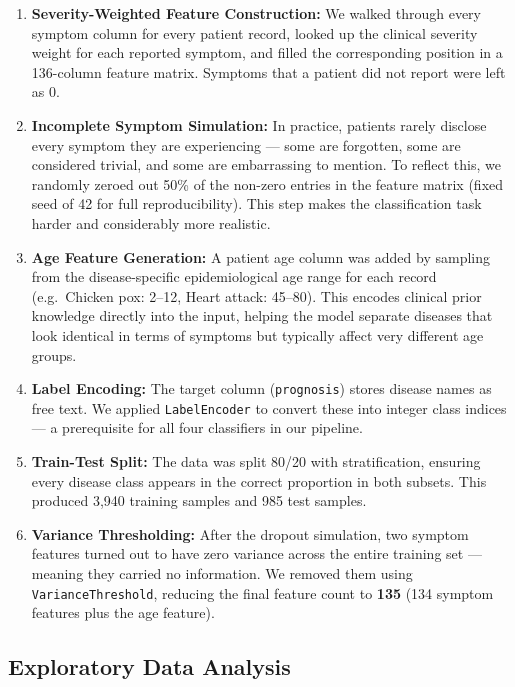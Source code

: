 \documentclass[12pt,a4paper]{article}
\begin{document}
\begin{enumerate}
    \item \textbf{Severity-Weighted Feature Construction:} We walked through every symptom column for every patient record, looked up the clinical severity weight for each reported symptom, and filled the corresponding position in a 136-column feature matrix. Symptoms that a patient did not report were left as 0.

    \item \textbf{Incomplete Symptom Simulation:} In practice, patients rarely disclose every symptom they are experiencing --- some are forgotten, some are considered trivial, and some are embarrassing to mention. To reflect this, we randomly zeroed out 50\% of the non-zero entries in the feature matrix (fixed seed of 42 for full reproducibility). This step makes the classification task harder and considerably more realistic.

    \item \textbf{Age Feature Generation:} A patient age column was added by sampling from the disease-specific epidemiological age range for each record (e.g.\ Chicken pox: 2--12, Heart attack: 45--80). This encodes clinical prior knowledge directly into the input, helping the model separate diseases that look identical in terms of symptoms but typically affect very different age groups.

    \item \textbf{Label Encoding:} The target column (\texttt{prognosis}) stores disease names as free text. We applied \texttt{LabelEncoder} to convert these into integer class indices --- a prerequisite for all four classifiers in our pipeline.

    \item \textbf{Train-Test Split:} The data was split 80/20 with stratification, ensuring every disease class appears in the correct proportion in both subsets. This produced 3,940 training samples and 985 test samples.

    \item \textbf{Variance Thresholding:} After the dropout simulation, two symptom features turned out to have zero variance across the entire training set --- meaning they carried no information. We removed them using \texttt{VarianceThreshold}, reducing the final feature count to \textbf{135} (134 symptom features plus the age feature).
\end{enumerate}

\subsection{Exploratory Data Analysis}
\end{document}
